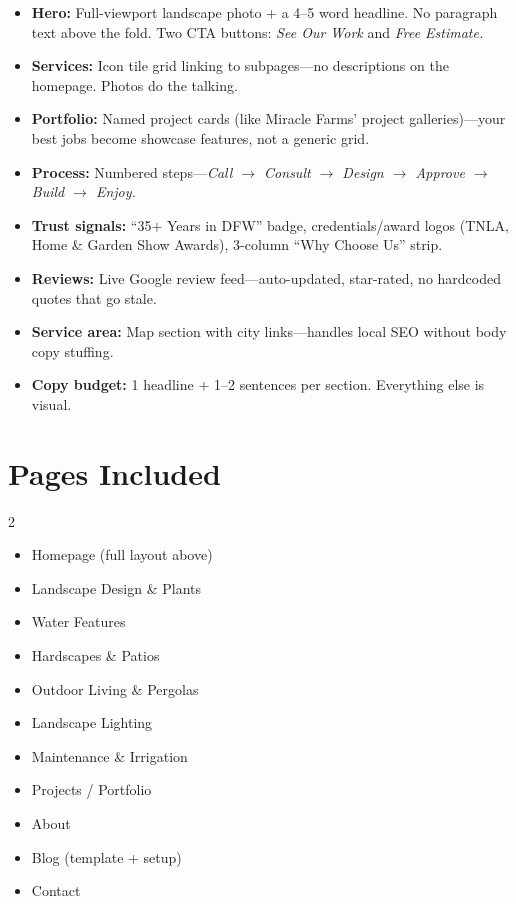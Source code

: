 \documentclass[11pt, letterpaper]{article}
\begin{document}
\begin{itemize}
  \item \textbf{Hero:} Full-viewport landscape photo + a 4--5 word headline.
        No paragraph text above the fold. Two CTA buttons: \emph{See Our Work}
        and \emph{Free Estimate.}
  \item \textbf{Services:} Icon tile grid linking to subpages---no descriptions
        on the homepage. Photos do the talking.
  \item \textbf{Portfolio:} Named project cards (like Miracle Farms' project
        galleries)---your best jobs become showcase features, not a generic grid.
  \item \textbf{Process:} Numbered steps---\emph{Call $\to$ Consult $\to$
        Design $\to$ Approve $\to$ Build $\to$ Enjoy.}
  \item \textbf{Trust signals:} ``35$+$ Years in DFW'' badge, credentials/award
        logos (TNLA, Home \& Garden Show Awards), 3-column ``Why Choose Us'' strip.
  \item \textbf{Reviews:} Live Google review feed---auto-updated, star-rated, no
        hardcoded quotes that go stale.
  \item \textbf{Service area:} Map section with city links---handles local SEO
        without body copy stuffing.
  \item \textbf{Copy budget:} 1 headline $+$ 1--2 sentences per section.
        Everything else is visual.
\end{itemize}

\section{Pages Included}

\begin{multicols}{2}
\begin{itemize}
  \item Homepage (full layout above)
  \item Landscape Design \& Plants
  \item Water Features
  \item Hardscapes \& Patios
  \item Outdoor Living \& Pergolas
  \item Landscape Lighting
  \item Maintenance \& Irrigation
  \item Projects / Portfolio
  \item About
  \item Blog (template + setup)
  \item Contact
\end{itemize}
\end{multicols}
\end{document}
